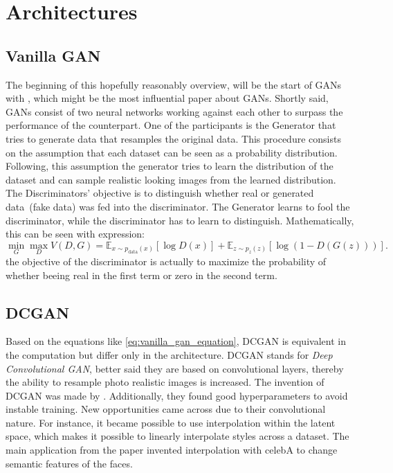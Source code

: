 \section{Architectures}
\label{sec:architectures}

\subsection{Vanilla GAN}
\label{sec:vanilla_gan}
The beginning of this hopefully reasonably overview, will be the start of GANs with \textcite{goodfellow2014gan}, which might be the most influential paper about GANs. Shortly said, GANs consist of two neural networks working against each other to surpass the performance of the counterpart. One of the participants is the Generator that tries to generate data that resamples the original data. This procedure consists on the assumption that each dataset can be seen as a probability distribution. Following, this assumption the generator tries to learn the distribution of the dataset and can sample realistic looking images from the learned distribution. The Discriminators' objective is to distinguish whether real or generated data~(fake data) was fed into the discriminator. The Generator learns to fool the discriminator, while the discriminator has to learn to distinguish. Mathematically, this can be seen with expression:
\begin{equation}
\min_G \max_D V(D,G)
=
\mathbb{E}_{x \sim p_{\mathrm{data}}(x)}
\left[\log D(x)\right]
+
\mathbb{E}_{z \sim p_z(z)}
\left[\log\left(1-D(G(z))\right)\right].
\label{eq:vanilla_gan_equation}
\end{equation}
the objective of the discriminator is actually to maximize the probability of whether beeing real in the first term or zero in the second term. \\





\subsection{DCGAN}
\label{sec:dcgan}
Based on the equations like \eqref{eq:vanilla_gan_equation}, DCGAN is equivalent in the computation but differ only in the architecture. DCGAN stands for \textit{Deep Convolutional GAN}, better said they are based on convolutional layers, thereby the ability to resample photo realistic images is increased. The invention of DCGAN was made by \textcite{radford2016dcgan}. Additionally, they found good hyperparameters to avoid instable training. New opportunities came across due to their convolutional nature. For instance, it became possible to use interpolation within the latent space, which makes it possible to linearly interpolate styles across a dataset. The main application from the paper invented interpolation with celebA to change semantic features of the faces. 


